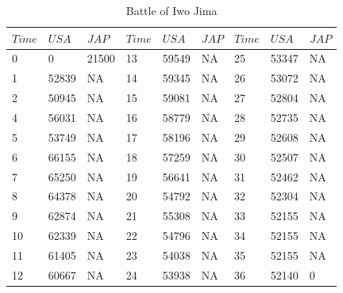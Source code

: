 \documentclass[]{article}
\begin{document}
\begin{table}
 \centering

\tiny
\caption{Battle of Iwo Jima\\}
\vspace{0.5 cm}
\tiny

{\begin{tabular}{|p{.5cm}|p{.5cm}|p{.5cm}|p{.5cm}|p{.5cm}|p{.5cm}|p{.5cm}|p{.5cm}|p{.5cm}|} 
\hline
\centering

$Time$ & $USA$ & $JAP$	& $Time$	& $USA$ & $JAP$	& $Time$ & $USA$	& $JAP$ \\
\hline  	
0&0&21500&13&59549&NA&25&53347&NA\\
\hline
1&	52839&	NA	&14	&59345&	NA&	26	&53072&	NA\\
\hline
2&	50945&	NA	&15&	59081&	NA&	27&	52804&	NA\\
\hline
4&	56031&	NA&	16&	58779	&NA	&28	&52735	&NA\\
\hline
5&	53749&	NA	&17&	58196&	NA&	29&	52608&	NA\\
\hline
6&	66155&	NA&	18&	57259	&NA&	30&	52507&	NA\\
\hline
7&	65250&	NA&	19&	56641&	NA&	31&	52462&	NA\\
\hline
8&	64378&	NA&	20&	54792&	NA&	32&	52304&	NA\\
\hline
9&	62874&	NA&	21&	55308&	NA&	33&	52155&	NA\\
\hline
10&	62339&	NA&	22&	54796&	NA&	34&	52155&	NA\\
\hline
11&	61405&	NA&	23&	54038&	NA&	35&	52155&	NA\\
\hline
12&	60667&	NA&	24&	53938&	NA&	36&	52140&	0\\
\hline

\end{tabular}}%
\tiny
\end{table}
\end{document}
